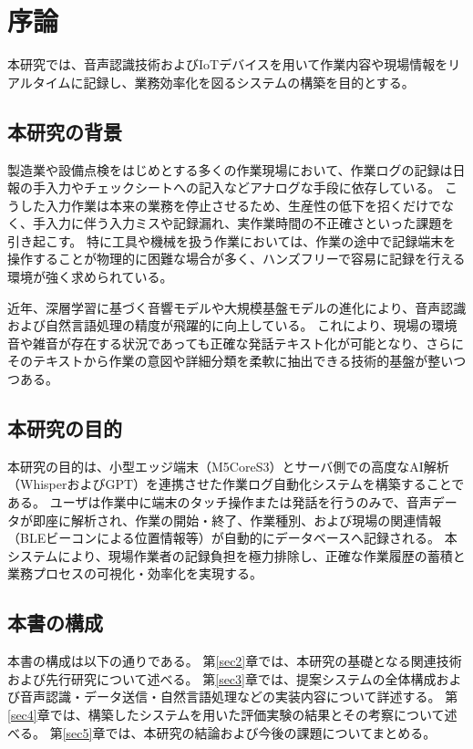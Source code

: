 \documentclass[a4paper,12pt,ja=standard,lualatex]{bxjsarticle}
\begin{document}
\tableofcontents
\newpage
\setcounter{page}{1}
\pagestyle{plain}

\section{序論}\label{sec1}
本研究では、音声認識技術およびIoTデバイスを用いて作業内容や現場情報をリアルタイムに記録し、業務効率化を図るシステムの構築を目的とする。

\subsection{本研究の背景}
製造業や設備点検をはじめとする多くの作業現場において、作業ログの記録は日報の手入力やチェックシートへの記入などアナログな手段に依存している。
こうした入力作業は本来の業務を停止させるため、生産性の低下を招くだけでなく、手入力に伴う入力ミスや記録漏れ、実作業時間の不正確さといった課題を引き起こす。
特に工具や機械を扱う作業においては、作業の途中で記録端末を操作することが物理的に困難な場合が多く、ハンズフリーで容易に記録を行える環境が強く求められている。

近年、深層学習に基づく音響モデルや大規模基盤モデルの進化により、音声認識および自然言語処理の精度が飛躍的に向上している。
これにより、現場の環境音や雑音が存在する状況であっても正確な発話テキスト化が可能となり、さらにそのテキストから作業の意図や詳細分類を柔軟に抽出できる技術的基盤が整いつつある。

\subsection{本研究の目的}
本研究の目的は、小型エッジ端末（M5CoreS3）とサーバ側での高度なAI解析（WhisperおよびGPT）を連携させた作業ログ自動化システムを構築することである。
ユーザは作業中に端末のタッチ操作または発話を行うのみで、音声データが即座に解析され、作業の開始・終了、作業種別、および現場の関連情報（BLEビーコンによる位置情報等）が自動的にデータベースへ記録される。
本システムにより、現場作業者の記録負担を極力排除し、正確な作業履歴の蓄積と業務プロセスの可視化・効率化を実現する。

\subsection{本書の構成}
本書の構成は以下の通りである。
第\ref{sec2}章では、本研究の基礎となる関連技術および先行研究について述べる。
第\ref{sec3}章では、提案システムの全体構成および音声認識・データ送信・自然言語処理などの実装内容について詳述する。
第\ref{sec4}章では、構築したシステムを用いた評価実験の結果とその考察について述べる。
第\ref{sec5}章では、本研究の結論および今後の課題についてまとめる。
\end{document}
